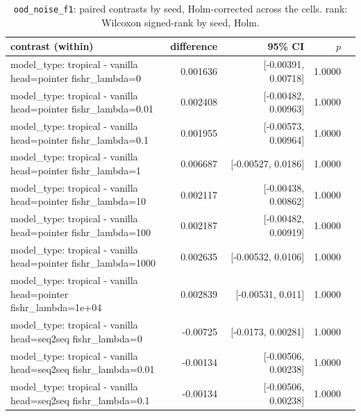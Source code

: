 \documentclass[10pt]{article}
\makeatletter
\newcommand{\stackcell}[1]{\begin{tabular}[t]{@{}l@{}}#1\end{tabular}}
\makeatother
\begin{document}
{\small
\begin{longtable}{lrrrl}
\caption{\texttt{ood\_noise\_f1}: paired contrasts by seed, Holm-corrected across the cells. rank: Wilcoxon signed-rank by seed, Holm.}\label{tab:paired-ood_noise_f1}\\
\toprule
contrast (within) & difference & 95\% CI & $p$ & \\
\midrule
\endhead
\stackcell{model\_type: tropical - vanilla\\\footnotesize head=pointer fishr\_lambda=0 } & 0.001636 & [-0.00391, 0.00718] & 1.0000 & \\
\stackcell{model\_type: tropical - vanilla\\\footnotesize head=pointer fishr\_lambda=0.01 } & 0.002408 & [-0.00482, 0.00963] & 1.0000 & \\
\stackcell{model\_type: tropical - vanilla\\\footnotesize head=pointer fishr\_lambda=0.1 } & 0.001955 & [-0.00573, 0.00964] & 1.0000 & \\
\stackcell{model\_type: tropical - vanilla\\\footnotesize head=pointer fishr\_lambda=1 } & 0.006687 & [-0.00527, 0.0186] & 1.0000 & \\
\stackcell{model\_type: tropical - vanilla\\\footnotesize head=pointer fishr\_lambda=10 } & 0.002117 & [-0.00438, 0.00862] & 1.0000 & \\
\stackcell{model\_type: tropical - vanilla\\\footnotesize head=pointer fishr\_lambda=100 } & 0.002187 & [-0.00482, 0.00919] & 1.0000 & \\
\stackcell{model\_type: tropical - vanilla\\\footnotesize head=pointer fishr\_lambda=1000 } & 0.002635 & [-0.00532, 0.0106] & 1.0000 & \\
\stackcell{model\_type: tropical - vanilla\\\footnotesize head=pointer fishr\_lambda=1e+04 } & 0.002839 & [-0.00531, 0.011] & 1.0000 & \\
\stackcell{model\_type: tropical - vanilla\\\footnotesize head=seq2seq fishr\_lambda=0 } & -0.00725 & [-0.0173, 0.00281] & 1.0000 & \\
\stackcell{model\_type: tropical - vanilla\\\footnotesize head=seq2seq fishr\_lambda=0.01 } & -0.00134 & [-0.00506, 0.00238] & 1.0000 & \\
\stackcell{model\_type: tropical - vanilla\\\footnotesize head=seq2seq fishr\_lambda=0.1 } & -0.00134 & [-0.00506, 0.00238] & 1.0000 & \\

\end{longtable}}
\end{document}
